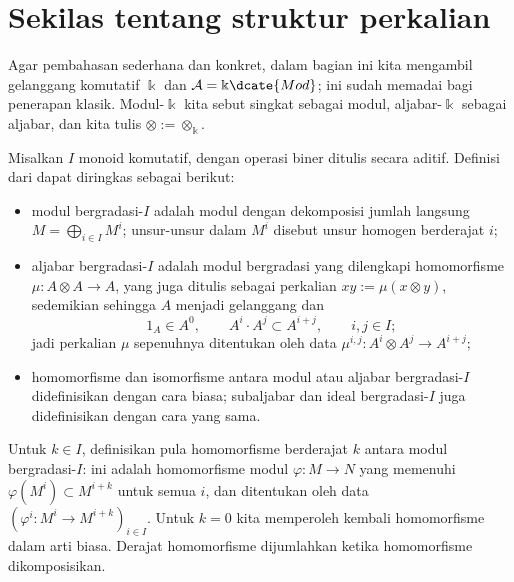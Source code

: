 
\section{Sekilas tentang struktur perkalian}\label{sec:multiplicative-SS}
\hypertarget{o014.aljabr2.chapter5.multiplicative-structures}{ }

Agar pembahasan sederhana dan konkret, dalam bagian ini kita mengambil
gelanggang komutatif $\Bbbk$ dan $\mathcal{A}=\Bbbk\dcate{Mod}$; ini sudah
memadai bagi penerapan klasik. Modul-$\Bbbk$ kita sebut singkat sebagai modul,
aljabar-$\Bbbk$ sebagai aljabar, dan kita tulis
$\otimes:=\otimes_{\Bbbk}$.

Misalkan $I$ monoid komutatif, dengan operasi biner ditulis secara aditif.
Definisi dari \cite[\S 7.4]{Li1} dapat diringkas sebagai berikut:
\begin{itemize}
	\item modul bergradasi-$I$ adalah modul dengan dekomposisi jumlah langsung
	$M=\bigoplus_{i\in I}M^i$; unsur-unsur dalam $M^i$ disebut unsur homogen
	berderajat $i$;
	\item aljabar bergradasi-$I$ adalah modul bergradasi yang dilengkapi
	homomorfisme $\mu:A\otimes A\to A$, yang juga ditulis sebagai perkalian
	$xy:=\mu(x\otimes y)$, sedemikian sehingga $A$ menjadi gelanggang dan
	\[ 1_A\in A^0,\qquad A^i\cdot A^j\subset A^{i+j},
	\qquad i,j\in I; \]
	jadi perkalian $\mu$ sepenuhnya ditentukan oleh data
	$\mu^{i,j}:A^i\otimes A^j\to A^{i+j}$;
	\item homomorfisme dan isomorfisme antara modul atau aljabar
	bergradasi-$I$ didefinisikan dengan cara biasa; subaljabar dan ideal
	bergradasi-$I$ juga didefinisikan dengan cara yang sama.
\end{itemize}

Untuk $k\in I$, definisikan pula homomorfisme berderajat $k$ antara modul
bergradasi-$I$: ini adalah homomorfisme modul $\varphi:M\to N$ yang memenuhi
$\varphi(M^i)\subset M^{i+k}$ untuk semua $i$, dan ditentukan oleh data
$(\varphi^i:M^i\to M^{i+k})_{i\in I}$. Untuk $k=0$ kita memperoleh kembali
homomorfisme dalam arti biasa. Derajat homomorfisme dijumlahkan ketika
homomorfisme dikomposisikan.

